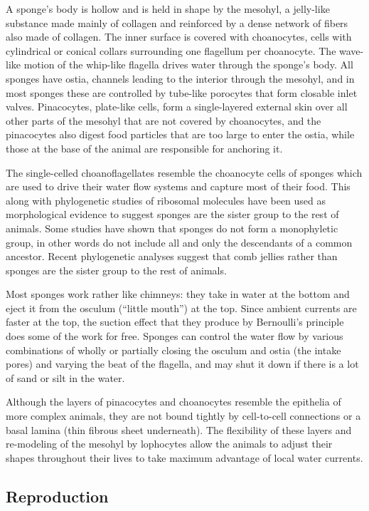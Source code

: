 \documentclass[]{book}
\theoremstyle{definition}
\theoremstyle{definition}
\theoremstyle{definition}
\theoremstyle{remark}
\begin{document}
A sponge's body is hollow and is held in shape by the mesohyl, a
jelly-like substance made mainly of collagen and reinforced by a dense
network of fibers also made of collagen. The inner surface is covered
with choanocytes, cells with cylindrical or conical collars surrounding
one flagellum per choanocyte. The wave-like motion of the whip-like
flagella drives water through the sponge's body. All sponges have ostia,
channels leading to the interior through the mesohyl, and in most
sponges these are controlled by tube-like porocytes that form closable
inlet valves. Pinacocytes, plate-like cells, form a single-layered
external skin over all other parts of the mesohyl that are not covered
by choanocytes, and the pinacocytes also digest food particles that are
too large to enter the ostia, while those at the base of the animal are
responsible for anchoring it.

The single-celled choanoflagellates resemble the choanocyte cells of
sponges which are used to drive their water flow systems and capture
most of their food. This along with phylogenetic studies of ribosomal
molecules have been used as morphological evidence to suggest sponges
are the sister group to the rest of animals. Some studies have shown
that sponges do not form a monophyletic group, in other words do not
include all and only the descendants of a common ancestor. Recent
phylogenetic analyses suggest that comb jellies rather than sponges are
the sister group to the rest of animals.

Most sponges work rather like chimneys: they take in water at the bottom
and eject it from the osculum (``little mouth'') at the top. Since
ambient currents are faster at the top, the suction effect that they
produce by Bernoulli's principle does some of the work for free. Sponges
can control the water flow by various combinations of wholly or
partially closing the osculum and ostia (the intake pores) and varying
the beat of the flagella, and may shut it down if there is a lot of sand
or silt in the water.

Although the layers of pinacocytes and choanocytes resemble the
epithelia of more complex animals, they are not bound tightly by
cell-to-cell connections or a basal lamina (thin fibrous sheet
underneath). The flexibility of these layers and re-modeling of the
mesohyl by lophocytes allow the animals to adjust their shapes
throughout their lives to take maximum advantage of local water
currents.

\subsection{Reproduction}\label{reproduction-1}
\end{document}
